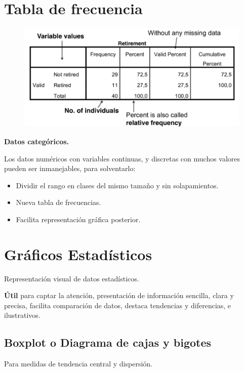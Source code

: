\documentclass[12pt]{report} %
\begin{document}
\section{Tabla de frecuencia}

\begin{figure}[H]
	{\includegraphics[scale=.5]{Untitled 3.png}}
\end{figure}

\textbf{Datos categóricos.}

Los datos numéricos con variables continuas, y discretas con muchos
valores pueden ser inmanejables, para solventarlo:

\begin{itemize}

\item
  Dividir el rango en clases del mismo tamaño y sin solapamientos.
\item
  Nueva tabla de frecuencias.
\item
  Facilita representación gráfica posterior.
\end{itemize}

\section{Gráficos Estadísticos}

Representación visual de datos estadísticos.

\textbf{Útil} para captar la atención, presentación de información
sencilla, clara y precisa, facilita comparación de datos, destaca
tendencias y diferencias, e ilustrativos.

\subsection{Boxplot o Diagrama de cajas y
bigotes}

Para medidas de tendencia central y dispersión.
\end{document}
